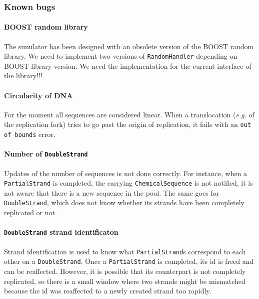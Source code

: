 \subsubsection{Known bugs}

\paragraph{BOOST random library} The simulator has been designed with an obsolete version of the BOOST random library. We need to implement two versions of \texttt{RandomHandler} depending on BOOST library version. We need the implementation for the current interface of the library!!!

\paragraph{Circularity of DNA} For the moment all sequences are considered linear. When a translocation (\textit{e.g.} of the replication fork) tries to go past the origin of replication, it fails with an \texttt{out of bounds} error.

\paragraph{Number of \texttt{DoubleStrand}} Updates of the number of sequences is not done correctly. For instance, when a \texttt{PartialStrand} is completed, the carrying \texttt{ChemicalSequence} is not notified, it is not aware that there is a new sequence in the pool. The same goes for \texttt{DoubleStrand}, which does not know whether its strands have been completely replicated or not.

\paragraph{\texttt{DoubleStrand} strand identificaton} Strand identification is used to know what \texttt{PartialStrand}s correspond to each other on a \texttt{DoubleStrand}. Once a \texttt{PartialStrand} is completed, its id is freed and can be reaffected. However, it is possible that its counterpart is not completely replicated, so there is a small window where two strands might be mismatched because the id was reaffected to a newly created strand too rapidly.

